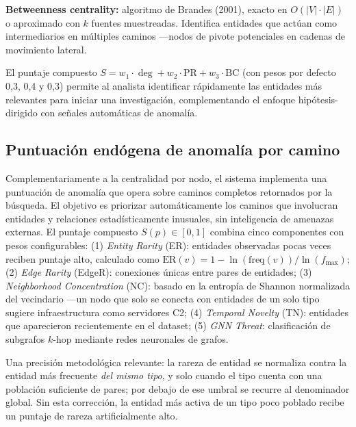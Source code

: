 \documentclass[11pt,a4paper]{article}
\begin{document}
\textbf{Betweenness centrality:} algoritmo de Brandes (2001), exacto en
$O(|V| \cdot |E|)$ o aproximado con $k$ fuentes muestreadas. Identifica
entidades que actúan como intermediarios en múltiples caminos ---nodos de
pivote potenciales en cadenas de movimiento lateral.

El puntaje compuesto $S = w_1 \cdot \deg + w_2 \cdot \mathrm{PR} + w_3 \cdot
\mathrm{BC}$ (con pesos por defecto 0,3, 0,4 y 0,3) permite al analista
identificar rápidamente las entidades más relevantes para iniciar una
investigación, complementando el enfoque hipótesis-dirigido con señales
automáticas de anomalía.

\subsection{Puntuación endógena de anomalía por camino}
Complementariamente a la centralidad por nodo, el sistema implementa una
puntuación de anomalía que opera sobre caminos completos retornados por la
búsqueda. El objetivo es priorizar automáticamente los caminos que involucran
entidades y relaciones estadísticamente inusuales, sin inteligencia de amenazas
externas. El puntaje compuesto $S(p) \in [0,1]$ combina cinco componentes con
pesos configurables: (1) \emph{Entity Rarity} (ER): entidades observadas pocas
veces reciben puntaje alto, calculado como
$\mathrm{ER}(v) = 1 - \ln(\mathrm{freq}(v)) / \ln(f_{\max})$; (2) \emph{Edge
Rarity} (EdgeR): conexiones únicas entre pares de entidades; (3)
\emph{Neighborhood Concentration} (NC): basado en la entropía de Shannon
normalizada del vecindario ---un nodo que solo se conecta con entidades de un
solo tipo sugiere infraestructura como servidores C2; (4) \emph{Temporal
Novelty} (TN): entidades que aparecieron recientemente en el dataset; (5)
\emph{GNN Threat}: clasificación de subgrafos $k$-hop mediante redes neuronales
de grafos.

Una precisión metodológica relevante: la rareza de entidad se normaliza contra
la entidad más frecuente \emph{del mismo tipo}, y solo cuando el tipo cuenta
con una población suficiente de pares; por debajo de ese umbral se recurre al
denominador global. Sin esta corrección, la entidad más activa de un tipo poco
poblado recibe un puntaje de rareza artificialmente alto.
\end{document}
